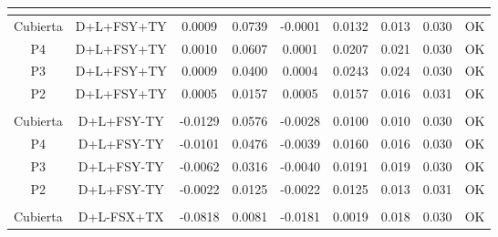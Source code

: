 \begin{table}[H]
{\begin{tabular}{|c|c|c|c|c|c|c|c|c|}
    \hline
    \multicolumn{1}{|r}{} & \multicolumn{1}{r}{} & \multicolumn{1}{r}{} & \multicolumn{1}{r}{} & \multicolumn{1}{r}{} & \multicolumn{1}{r}{} & \multicolumn{1}{r}{} & \multicolumn{1}{r}{} &  \bigstrut\\
    \hline
    Cubierta & D+L+FSY+TY & 0.0009 & 0.0739 & -0.0001 & 0.0132 & 0.013 & 0.030 & \cellcolor[rgb]{ .776,  .937,  .808}\textcolor[rgb]{ 0,  .38,  0}{OK} \bigstrut\\
    \hline
    P4  & D+L+FSY+TY & 0.0010 & 0.0607 & 0.0001 & 0.0207 & 0.021 & 0.030 & \cellcolor[rgb]{ .776,  .937,  .808}\textcolor[rgb]{ 0,  .38,  0}{OK} \bigstrut\\
    \hline
    P3  & D+L+FSY+TY & 0.0009 & 0.0400 & 0.0004 & 0.0243 & 0.024 & 0.030 & \cellcolor[rgb]{ .776,  .937,  .808}\textcolor[rgb]{ 0,  .38,  0}{OK} \bigstrut\\
    \hline
    P2  & D+L+FSY+TY & 0.0005 & 0.0157 & 0.0005 & 0.0157 & 0.016 & 0.031 & \cellcolor[rgb]{ .776,  .937,  .808}\textcolor[rgb]{ 0,  .38,  0}{OK} \bigstrut\\
    \hline
    \multicolumn{1}{|r}{} & \multicolumn{1}{r}{} & \multicolumn{1}{r}{} & \multicolumn{1}{r}{} & \multicolumn{1}{r}{} & \multicolumn{1}{r}{} & \multicolumn{1}{r}{} & \multicolumn{1}{r}{} &  \bigstrut\\
    \hline
    Cubierta & D+L+FSY-TY & -0.0129 & 0.0576 & -0.0028 & 0.0100 & 0.010 & 0.030 & \cellcolor[rgb]{ .776,  .937,  .808}\textcolor[rgb]{ 0,  .38,  0}{OK} \bigstrut\\
    \hline
    P4  & D+L+FSY-TY & -0.0101 & 0.0476 & -0.0039 & 0.0160 & 0.016 & 0.030 & \cellcolor[rgb]{ .776,  .937,  .808}\textcolor[rgb]{ 0,  .38,  0}{OK} \bigstrut\\
    \hline
    P3  & D+L+FSY-TY & -0.0062 & 0.0316 & -0.0040 & 0.0191 & 0.019 & 0.030 & \cellcolor[rgb]{ .776,  .937,  .808}\textcolor[rgb]{ 0,  .38,  0}{OK} \bigstrut\\
    \hline
    P2  & D+L+FSY-TY & -0.0022 & 0.0125 & -0.0022 & 0.0125 & 0.013 & 0.031 & \cellcolor[rgb]{ .776,  .937,  .808}\textcolor[rgb]{ 0,  .38,  0}{OK} \bigstrut\\
    \hline
    \multicolumn{1}{|r}{} & \multicolumn{1}{r}{} & \multicolumn{1}{r}{} & \multicolumn{1}{r}{} & \multicolumn{1}{r}{} & \multicolumn{1}{r}{} & \multicolumn{1}{r}{} & \multicolumn{1}{r}{} &  \bigstrut\\
    \hline
    Cubierta & D+L-FSX+TX & -0.0818 & 0.0081 & -0.0181 & 0.0019 & 0.018 & 0.030 & \cellcolor[rgb]{ .776,  .937,  .808}\textcolor[rgb]{ 0,  .38,  0}{OK} \bigstrut\\

\end{tabular}}
\end{table}
